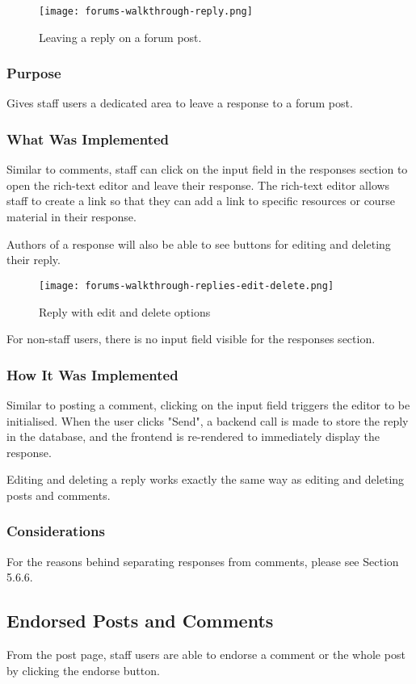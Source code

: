 \begin{figure}[h!]
    \texttt{[image: forums-walkthrough-reply.png]}
    \centering
    \caption{Leaving a reply on a forum post.}
\end{figure}

\subsubsection{Purpose}
Gives staff users a dedicated area to leave a response to a forum post.

\subsubsection{What Was Implemented}
Similar to comments, staff can click on the input field in the responses section to open the rich-text editor and leave their response.
The rich-text editor allows staff to create a link so that they can add a link to specific resources or course material in their response.

Authors of a response will also be able to see buttons for editing and deleting their reply.

\begin{figure}[h!]
    \texttt{[image: forums-walkthrough-replies-edit-delete.png]}
    \centering
    \caption{Reply with edit and delete options}
\end{figure}

For non-staff users, there is no input field visible for the responses section.

\subsubsection{How It Was Implemented}
Similar to posting a comment, clicking on the input field triggers the editor to be initialised.
When the user clicks "Send", a backend call is made to store the reply in the database, and the frontend is re-rendered to immediately display the response.

Editing and deleting a reply works exactly the same way as editing and deleting posts and comments.

\subsubsection{Considerations}
For the reasons behind separating responses from comments, please see Section 5.6.6.

\subsection{Endorsed Posts and Comments}
From the post page, staff users are able to endorse a comment or the whole post by clicking the endorse button.

